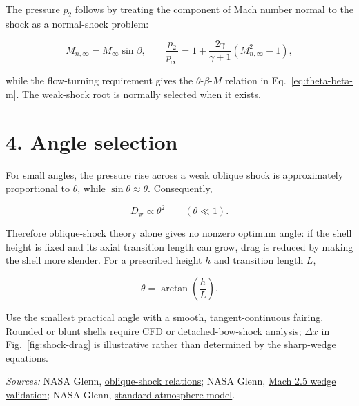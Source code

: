 \documentclass[10pt]{article}
\begin{document}
The pressure $p_2$ follows by treating the component of Mach number normal to the shock
as a normal-shock problem:

\begin{equation}
  M_{n,\infty}=M_\infty\sin\beta,
  \qquad
  \frac{p_2}{p_\infty}=1+\frac{2\gamma}{\gamma+1}
  \left(M_{n,\infty}^2-1\right),
\end{equation}

while the flow-turning requirement gives the $\theta$-$\beta$-$M$ relation in
Eq.~\eqref{eq:theta-beta-m}. The weak-shock root is normally selected when it exists.

\enlargethispage{2\baselineskip}
\section*{4. Angle selection}

For small angles, the pressure rise across a weak oblique shock is approximately
proportional to $\theta$, while $\sin\theta\approx\theta$. Consequently,

\begin{equation}
  D_{\mathrm w}\propto\theta^2
  \qquad (\theta\ll1).
\end{equation}

Therefore oblique-shock theory alone gives no nonzero optimum angle: if the shell height
is fixed and its axial transition length can grow, drag is reduced by making the shell
more slender. For a prescribed height $h$ and transition length $L$,

\begin{equation}
  \theta=\arctan\!\left(\frac{h}{L}\right).
\end{equation}

{\scriptsize
Use the smallest practical angle with a smooth, tangent-continuous fairing. Rounded or
blunt shells require CFD or detached-bow-shock analysis; $\Delta x$ in Fig.~\ref{fig:shock-drag}
is illustrative rather than determined by the sharp-wedge equations.

\par\vspace{1pt}
\textit{Sources:}
NASA Glenn, \href{https://www.grc.nasa.gov/www/BGH/oblique.html}{oblique-shock relations};
NASA Glenn, \href{https://www.grc.nasa.gov/www/wind/valid/wedge/wedge.html}{Mach 2.5 wedge validation};
NASA Glenn, \href{https://www1.grc.nasa.gov/beginners-guide-to-aeronautics/earth-atmosphere-equation-english/}{standard-atmosphere model}.
\par}
\end{document}
